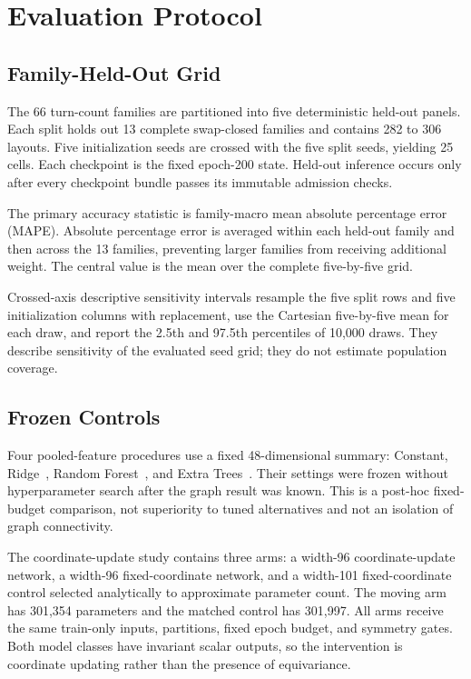 \documentclass[journal]{IEEEtran}
\begin{document}
\section{Evaluation Protocol}
\subsection{Family-Held-Out Grid}
The 66 turn-count families are partitioned into five deterministic held-out panels. Each split holds out 13 complete swap-closed families and contains 282 to 306 layouts. Five initialization seeds are crossed with the five split seeds, yielding 25 cells. Each checkpoint is the fixed epoch-200 state. Held-out inference occurs only after every checkpoint bundle passes its immutable admission checks.

The primary accuracy statistic is family-macro mean absolute percentage error (MAPE). Absolute percentage error is averaged within each held-out family and then across the 13 families, preventing larger families from receiving additional weight. The central value is the mean over the complete five-by-five grid.

Crossed-axis descriptive sensitivity intervals resample the five split rows and five initialization columns with replacement, use the Cartesian five-by-five mean for each draw, and report the 2.5th and 97.5th percentiles of 10,000 draws. They describe sensitivity of the evaluated seed grid; they do not estimate population coverage.

\subsection{Frozen Controls}
Four pooled-feature procedures use a fixed 48-dimensional summary: Constant, Ridge~\cite{ridge}, Random Forest~\cite{randomforest}, and Extra Trees~\cite{extratrees}. Their settings were frozen without hyperparameter search after the graph result was known. This is a post-hoc fixed-budget comparison, not superiority to tuned alternatives and not an isolation of graph connectivity.

The coordinate-update study contains three arms: a width-96 coordinate-update network, a width-96 fixed-coordinate network, and a width-101 fixed-coordinate control selected analytically to approximate parameter count. The moving arm has 301,354 parameters and the matched control has 301,997. All arms receive the same train-only inputs, partitions, fixed epoch budget, and symmetry gates. Both model classes have invariant scalar outputs, so the intervention is coordinate updating rather than the presence of equivariance.
\end{document}
